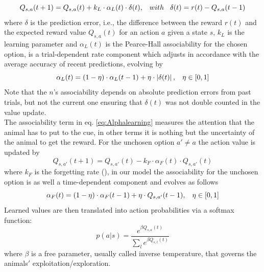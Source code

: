 \begin{equation}
Q_{s,a}(t+1)  = Q_{s,a}(t)+k_L\cdot\alpha_L(t)\cdot\delta(t), \hspace{0.3cm} with \hspace{0.3cm}\delta(t)=r(t)-Q_{s,a}(t-1)
\label{eq:Qlearning}
\end{equation}
where $\delta$ is the prediction error, i.e., the difference between the reward $r(t)$ and the expected reward value $Q_{s,a}(t)$ for an action $a$ given a state $s$, $k_L$ is the learning parameter and $\alpha_L(t)$ is the Pearce-Hall associability for the chosen option, is a trial-dependent rate component which adjusts in accordance with the average accuracy of recent predictions, evolving by
\begin{equation}
   \alpha_L(t)=(1-\eta)\cdot\alpha_L(t-1)+\eta\cdot\left\lvert\delta(t)\right\rvert,\hspace{0.3cm} \eta\in[0,1]
    \label{eq:Alphalearning}
\end{equation}
Note that the $n$'s associability depends on absolute prediction errors from past trials, but not the current one ensuring that $\delta(t)$ was not double counted in the value update.\\The associability term in eq. \ref{eq:Alphalearning} measures the attention that the animal has to put to the cue, in other terms it is nothing but the uncertainty of the animal to get the reward. 
For the unchosen option $a'\neq a$ the action value is updated by
\begin{equation}
    Q_{s,a'}(t+1) = Q_{s,a'}(t)-k_F\cdot\alpha_F(t)\cdot Q_{s,a'}(t)
    \label{eq:Qforgetting}
\end{equation}
where $k_F$ is the forgetting rate (\cite{ItoDoya1}), in our model the associability for the unchosen option is as well a time-dependent component and evolves as follows
\begin{equation}
    \alpha_F(t)=(1-\eta)\cdot\alpha_F(t-1)+\eta\cdot Q_{s,a'}(t-1), \hspace{0.3cm}
    \eta\in[0,1]
    \label{eq:Alphaforgetting}
\end{equation}
Learned values are then translated into action probabilities via a softmax function:
\begin{equation}
p(a|s)=\frac{e^{\beta Q_{s,a}(t)}}{\sum_l e^{\beta Q_{s,l}(t)}}
\label{eq:ProbMod}
\end{equation}
where $\beta$ is a free parameter, usually called inverse temperature, that governs the animals$'$ exploitation/exploration.\\
